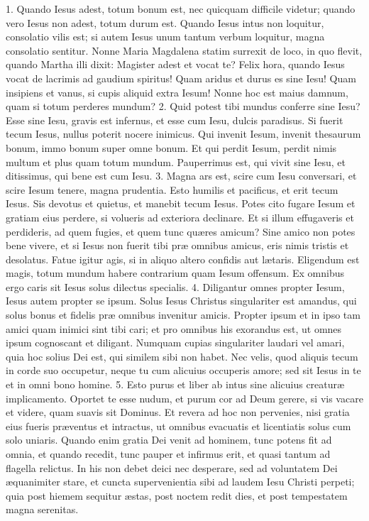 1. Quando Iesus adest, totum bonum est, nec quicquam difficile videtur; quando vero Iesus non adest, totum durum est. Quando Iesus intus non loquitur, consolatio vilis est; si autem Iesus unum tantum verbum loquitur, magna consolatio sentitur. Nonne Maria Magdalena statim surrexit de loco, in quo flevit, quando Martha illi dixit: Magister adest et vocat te? Felix hora, quando Iesus vocat de lacrimis ad gaudium spiritus! Quam aridus et durus es sine Iesu! Quam insipiens et vanus, si cupis aliquid extra Iesum! Nonne hoc est maius damnum, quam si totum perderes mundum?
2. Quid potest tibi mundus conferre sine Iesu? Esse sine Iesu, gravis est infernus, et esse cum Iesu, dulcis paradisus. Si fuerit tecum Iesus, nullus poterit nocere inimicus. Qui invenit Iesum, invenit thesaurum bonum, immo bonum super omne bonum. Et qui perdit Iesum, perdit nimis multum et plus quam totum mundum. Pauperrimus est, qui vivit sine Iesu, et ditissimus, qui bene est cum Iesu.
3. Magna ars est, scire cum Iesu conversari, et scire Iesum tenere, magna prudentia. Esto humilis et pacificus, et erit tecum Iesus. Sis devotus et quietus, et manebit tecum Iesus. Potes cito fugare Iesum et gratiam eius perdere, si volueris ad exteriora declinare. Et si illum effugaveris et perdideris, ad quem fugies, et quem tunc quæres amicum? Sine amico non potes bene vivere, et si Iesus non fuerit tibi præ omnibus amicus, eris nimis tristis et desolatus. Fatue igitur agis, si in aliquo altero confidis aut lætaris. Eligendum est magis, totum mundum habere contrarium quam Iesum offensum. Ex omnibus ergo caris sit Iesus solus dilectus specialis.
4. Diligantur omnes propter Iesum, Iesus autem propter se ipsum. Solus Iesus Christus singulariter est amandus, qui solus bonus et fidelis præ omnibus invenitur amicis. Propter ipsum et in ipso tam amici quam inimici sint tibi cari; et pro omnibus his exorandus est, ut omnes ipsum cognoscant et diligant. Numquam cupias singulariter laudari vel amari, quia hoc solius Dei est, qui similem sibi non habet. Nec velis, quod aliquis tecum in corde suo occupetur, neque tu cum alicuius occuperis amore; sed sit Iesus in te et in omni bono homine.
5. Esto purus et liber ab intus sine alicuius creaturæ implicamento. Oportet te esse nudum, et purum cor ad Deum gerere, si vis vacare et videre, quam suavis sit Dominus. Et revera ad hoc non pervenies, nisi gratia eius fueris præventus et intractus, ut omnibus evacuatis et licentiatis solus cum solo uniaris. Quando enim gratia Dei venit ad hominem, tunc potens fit ad omnia, et quando recedit, tunc pauper et infirmus erit, et quasi tantum ad flagella relictus. In his non debet deici nec desperare, sed ad voluntatem Dei æquanimiter stare, et cuncta supervenientia sibi ad laudem Iesu Christi perpeti; quia post hiemem sequitur æstas, post noctem redit dies, et post tempestatem magna serenitas.



